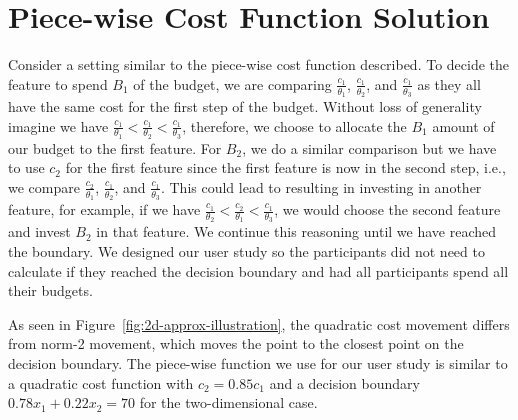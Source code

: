 \section{Piece-wise Cost Function Solution}\label{sec:app-piece-wise-sol}
Consider a setting similar to the piece-wise cost function described. To decide the feature to spend $B_1$ of the budget, we are comparing $\frac{c_1}{\theta_1}$, $\frac{c_1}{\theta_2}$, and $\frac{c_1}{\theta_3}$ as they all have the same cost for the first step of the budget. Without loss of generality imagine we have $\frac{c_1}{\theta_1} < \frac{c_1}{\theta_2} < \frac{c_1}{\theta_3}$, therefore, we choose to allocate the $B_1$ amount of our budget to the first feature. For $B_2$, we do a similar comparison but we have to use $c_2$ for the first feature since the first feature is now in the second step, i.e., we compare $\frac{c_2}{\theta_1}$, $\frac{c_1}{\theta_2}$, and $\frac{c_1}{\theta_3}$. This could lead to resulting in investing in another feature, for example, if we have $\frac{c_1}{\theta_2} < \frac{c_2}{\theta_1} < \frac{c_1}{\theta_3}$, we would choose the second feature and invest $B_2$ in that feature. We continue this reasoning until we have reached the boundary. We designed our user study so the participants did not need to calculate if they reached the decision boundary and had all participants spend all their budgets. 

As seen in Figure~\ref{fig:2d-approx-illustration}, the quadratic cost movement differs from norm-2 movement, which moves the point to the closest point on the decision boundary. The piece-wise function we use for our user study is similar to a quadratic cost function with $c_2=0.85c_1$ and a decision boundary $0.78x_1+0.22x_2=70$ for the two-dimensional case. 
